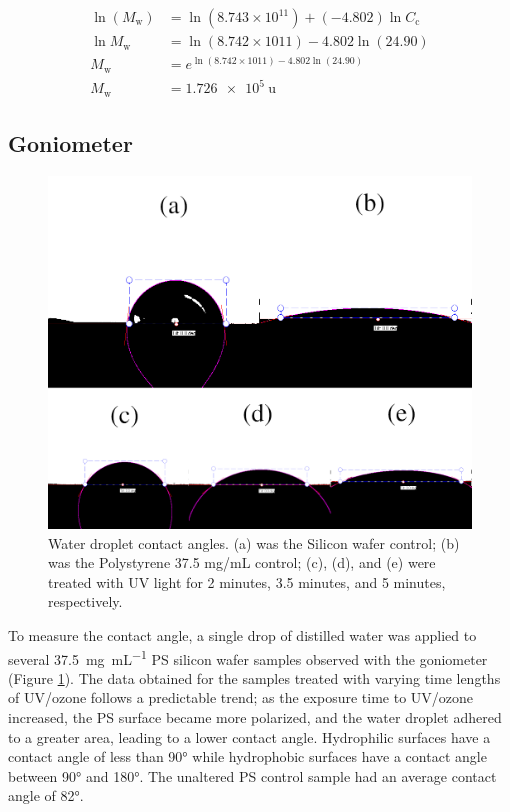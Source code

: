 \documentclass[twocolumn]{article}
\begin{document}
                \begin{align}
                    \ln{(M_\text{w})} &= \ln{(8.743 \times 10^{11})} + (- 4.802) \ln{C_\text{c}}\\
                    \ln{M_\text{w}} &= \ln{(8.742 \times 1011)} - 4.802 \ln{(24.90)} \nonumber\\
                    M_\text{w} &= e^{\ln{(8.742 \times 1011)} - 4.802 \ln{(24.90)}} \nonumber\\
                    M_\text{w} &= \qty{1.726e5}{\atomicmassunit} \nonumber
                \end{align}

            \subsection{Goniometer}
                \begin{figure}
                    \centering
                    \includegraphics[width=0.8\columnwidth]{img/contact.png}
                    \caption{Water droplet contact angles. (a) was the Silicon wafer control; (b) was the Polystyrene 37.5 mg/mL control; (c), (d), and (e) were treated with UV light for 2 minutes, 3.5 minutes, and 5 minutes, respectively.}\label{fig:contact}
                \end{figure}
                To measure the contact angle, a single drop of distilled water was applied to several \qty{37.5}{\milli\gram\per\milli\liter} PS silicon wafer samples observed with the goniometer (Figure \ref{fig:contact}). The data obtained for the samples treated with varying time lengths of UV/ozone follows a predictable trend; as the exposure time to UV/ozone increased, the PS surface became more polarized, and the water droplet adhered to a greater area, leading to a lower contact angle. Hydrophilic surfaces have a contact angle of less than 90° while hydrophobic surfaces have a contact angle between 90° and 180°. The unaltered PS control sample had an average contact angle of 82°.
\end{document}
